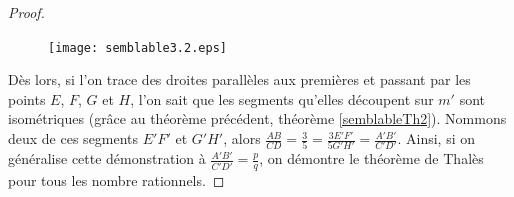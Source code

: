 \documentclass[a4paper,12pt]{article}
\begin{document}
\begin{proof}
\begin{figure}[H]
        \centering
        \texttt{[image: semblable3.2.eps]}
    \end{figure}

 Dès lors, si l'on trace des droites parallèles aux premières et passant par les points $E$, $F$, $G$ et $H$, l'on sait que les segments qu'elles découpent sur $m'$ sont isométriques (grâce au théorème précédent, théorème \ref{semblableTh2}). Nommons deux de ces segments $E'F'$ et $G'H'$, alors $\frac{AB}{CD} = \frac{3}{5} = \frac{3E'F'}{5G'H'} = \frac{A'B'}{C'D'}$.
Ainsi, si on généralise cette démonstration à $\frac{A'B'}{C'D'} = \frac{p}{q}$, on démontre le théorème de Thalès pour tous les nombre rationnels.
\end{proof}
\end{document}
